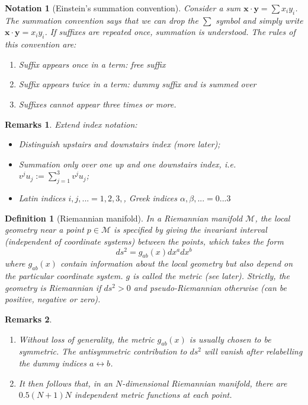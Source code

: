 \documentclass[a4paper]{article}
\newtheorem{remarks}{Remarks}[section]
\newtheorem{notation}{Notation}[section]
\theoremstyle{new}
\newtheorem{defi}{Definition}[section]
\begin{document}
\begin{notation}[Einstein's summation convention]
  Consider a sum $\mathbf{x}\cdot \mathbf{y} = \sum x_i y_i$. The summation convention says that we can drop the $\sum$ symbol and simply write $\mathbf{x}\cdot \mathbf{y} = x_i y_i$. If suffixes are repeated once, summation is understood. The rules of this convention are:
  \begin{enumerate}
    \item Suffix appears once in a term: free suffix
    \item Suffix appears twice in a term: dummy suffix and is summed over
    \item Suffixes cannot appear three times or more.
  \end{enumerate}
\end{notation}
\begin{remarks}
Extend index notation:
\begin{itemize}
    \item Distinguish upstairs and downstairs index (more later);
    \item Summation only over one up and one downstairs index, i.e. $v^ju_j:=\sum_{j=1}^3v^ju_j$;
    \item Latin indices $i,j,...=1,2,3,$, Greek indices $\alpha,\beta,...=0...3$
\end{itemize}
\end{remarks}
\begin{defi}[Riemannian manifold]
In a Riemannian manifold $\mathcal{M}$, the local geometry near a point $p\in\mathcal{M}$ is specified by giving the invariant interval (independent of coordinate systems) between the points, which takes the form
$$ds^2=g_{ab}(x)dx^adx^b$$
where $g_{ab}(x)$ contain information about the local geometry but also depend on the particular coordinate system. $g$ is called the metric (see later). Strictly, the geometry is Riemannian if $ds^2>0$ and pseudo-Riemannian otherwise (can be positive, negative or zero).
\end{defi}
\begin{remarks}\leavevmode
\begin{enumerate}
    \item Without loss of generality, the metric $g_{ab}(x)$ is usually chosen to be symmetric. The antisymmetric contribution to $ds^2$ will vanish after relabelling the dummy indices $a\leftrightarrow b$.
    \item It then follows that, in an $N$-dimensional Riemannian manifold, there are $0.5(N+1)N$ independent metric functions at each point.
\end{enumerate}
\end{remarks}
\end{document}
